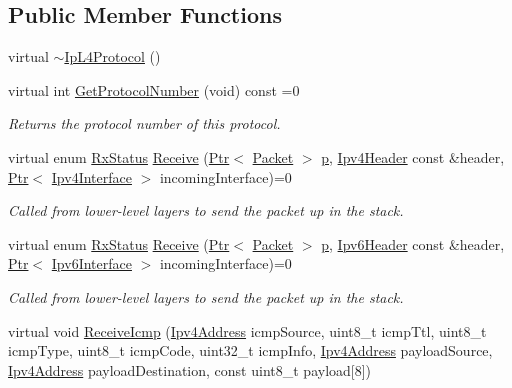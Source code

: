 \subsection*{Public Member Functions}
\begin{DoxyCompactItemize}
\item 
virtual \hyperlink{classns3_1_1IpL4Protocol_a8cda04872f8d9d2b54b1fce9d9e1b1b5}{$\sim$\+Ip\+L4\+Protocol} ()
\item 
virtual int \hyperlink{classns3_1_1IpL4Protocol_aa5b2c5a670f5304b1a36b890ea858977}{Get\+Protocol\+Number} (void) const =0
\begin{DoxyCompactList}\small\item\em Returns the protocol number of this protocol. \end{DoxyCompactList}\item 
virtual enum \hyperlink{classns3_1_1IpL4Protocol_afd3744c89902fff232e2fd45f558c80e}{Rx\+Status} \hyperlink{classns3_1_1IpL4Protocol_ad184969a1d9fd630f09e61d15ccad19d}{Receive} (\hyperlink{classns3_1_1Ptr}{Ptr}$<$ \hyperlink{classns3_1_1Packet}{Packet} $>$ \hyperlink{lte__link__budget__x2__handover__measures_8m_ac9de518908a968428863f829398a4e62}{p}, \hyperlink{classns3_1_1Ipv4Header}{Ipv4\+Header} const \&header, \hyperlink{classns3_1_1Ptr}{Ptr}$<$ \hyperlink{classns3_1_1Ipv4Interface}{Ipv4\+Interface} $>$ incoming\+Interface)=0
\begin{DoxyCompactList}\small\item\em Called from lower-\/level layers to send the packet up in the stack. \end{DoxyCompactList}\item 
virtual enum \hyperlink{classns3_1_1IpL4Protocol_afd3744c89902fff232e2fd45f558c80e}{Rx\+Status} \hyperlink{classns3_1_1IpL4Protocol_a1722da521b414c28875cb2a4f4aaf242}{Receive} (\hyperlink{classns3_1_1Ptr}{Ptr}$<$ \hyperlink{classns3_1_1Packet}{Packet} $>$ \hyperlink{lte__link__budget__x2__handover__measures_8m_ac9de518908a968428863f829398a4e62}{p}, \hyperlink{classns3_1_1Ipv6Header}{Ipv6\+Header} const \&header, \hyperlink{classns3_1_1Ptr}{Ptr}$<$ \hyperlink{classns3_1_1Ipv6Interface}{Ipv6\+Interface} $>$ incoming\+Interface)=0
\begin{DoxyCompactList}\small\item\em Called from lower-\/level layers to send the packet up in the stack. \end{DoxyCompactList}\item 
virtual void \hyperlink{classns3_1_1IpL4Protocol_a4859731c656d5309c07d2d47bacd4121}{Receive\+Icmp} (\hyperlink{classns3_1_1Ipv4Address}{Ipv4\+Address} icmp\+Source, uint8\+\_\+t icmp\+Ttl, uint8\+\_\+t icmp\+Type, uint8\+\_\+t icmp\+Code, uint32\+\_\+t icmp\+Info, \hyperlink{classns3_1_1Ipv4Address}{Ipv4\+Address} payload\+Source, \hyperlink{classns3_1_1Ipv4Address}{Ipv4\+Address} payload\+Destination, const uint8\+\_\+t payload\mbox{[}8\mbox{]})

\end{DoxyCompactItemize}
